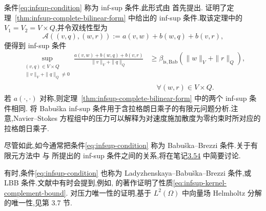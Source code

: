 \begin{note}\label{note:babuska-brezzi-condition}
条件\cref{eq:infsup-condition} 称为 inf-sup 条件.此形式由\textcite{Brezzi1974} 首先提出.\textcite{Babuska1971} 证明了定理~\ref{thm:infsup-complete-bilinear-form} 中给出的 inf-sup 条件.取该定理中的 $V_1=V_2=V\times Q$,并令双线性型为
\[
  \mathcal{A}((v,q),(w,r))
    :=a(v,w)+b(w,q)+b(v,r),
\]
便得到 inf-sup 条件
\[
  \begin{aligned}
    \sup_{\substack{(v,q)\in V\times Q\\
        \|v\|_V+\|q\|_Q\ne0}}
    \frac{a(v,w)+b(w,q)+b(v,r)}{\|v\|_V+\|q\|_Q}
    &\ge\beta_{\mathrm{is,Bab}}
       (\|w\|_V+\|r\|_Q),\\
    &\quad\forall(w,r)\in V\times Q.
  \end{aligned}
\]
若 $a(\cdot,\cdot)$ 对称,则定理~\ref{thm:infsup-complete-bilinear-form} 中的两个 inf-sup 条件相同.\textcite{Babuska1973} 将 Babuška inf-sup 条件用于含拉格朗日乘子的有限元问题分析.注意,Navier--Stokes 方程组中的压力可以解释为对速度施加散度为零约束时所对应的拉格朗日乘子.

尽管如此,如今通常把条件\cref{eq:infsup-condition} 称为 Babuška--Brezzi 条件.关于有限元方法中\textcite{Babuska1971,Babuska1973} 与\textcite{Brezzi1974} 所提出的 inf-sup 条件之间的关系,将在笔记\hyperref[note:discrete-babuska-condition]{3.54} 中简要讨论.

有时,条件\cref{eq:infsup-condition} 也称为 Ladyzhenskaya--Babuška--Brezzi 条件,或 LBB 条件.文献中有时会提到,例如\textcite{Gunzburger2002},\textcite{Ladyzhenskaya1969} 的著作证明了性质\cref{eq:infsup-kernel-complement-bound}.\textcite[第 2.1 章]{Ladyzhenskaya1969} 对压力唯一性的证明,基于 $L^2(\Omega)$ 中向量场 Helmholtz 分解的唯一性,见第 3.7 节.
\end{note}

